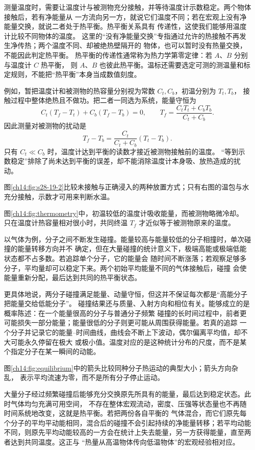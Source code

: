 测量温度时，需要让温度计与被测物充分接触，并等待温度计示数稳定。两个物体接触后，若有净能量从
一方流向另一方，就说它们温度不同；若在宏观上没有净能量交换，就说二者处于热平衡。热平衡关系具有
传递性，这使我们能够用温度计比较不同物体的温度。
这里的“没有净能量交换”专指通过允许的热接触不再发生净传热；两个温度不同、却被绝热壁隔开的
物体，也可以暂时没有热量交换，不能因此判定热平衡。
热平衡的传递性通常称为热力学第零定律：若 $A$、$B$ 分别与温度计 $C$ 热平衡，
则 $A$、$B$ 也彼此热平衡。温标还需要选定可测的测温量和标定规则，不能把“热平衡”本身当成数值刻度。

例如，暂把温度计和被测物的热容量分别视为常数 $C_t,C_b$，初温分别为 $T_t,T_b$，
接触过程中整体绝热且不做功。把二者一同选为系统，能量守恒为
\[
 C_t(T_f-T_t)+C_b(T_f-T_b)=0,
 \qquad T_f=\frac{C_tT_t+C_bT_b}{C_t+C_b}.
\]
因此测量对被测物的扰动是
\[
 T_f-T_b=\frac{C_t}{C_t+C_b}(T_t-T_b).
\]
只有 $C_t\ll C_b$ 时，温度计达到平衡的读数才接近被测物接触前的温度。
“等到示数稳定”排除了尚未达到平衡的误差，却不能消除温度计本身吸、放热造成的扰动。

图\ref{ch14:fig:s28-19-2}比较未接触与正确浸入的两种放置方式；只有右图的温包与水充分接触，示数才可用来判断水温。
\figureNineteenTwoFaithful

图\ref{ch14:fig:thermometry}中，初温较低的温度计吸收能量，而被测物略微冷却。
只在温度计热容量相对很小时，共同终温 $T_f$ 才近似等于被测物原来的温度。
\thermometerMeasurementDiagram

以气体为例，分子之间不断发生碰撞。能量较高与能量较低的分子相撞时，单次碰撞的能量转移方向并不
确定，但在大量碰撞的统计意义下，极端高能或极端低能状态都不占多数。若追踪单个分子，它的能量会
随时间不断涨落；若观察足够多分子，平均量却可以稳定下来。两个初始平均能量不同的气体接触后，碰撞
会使能量重新分配，最后达到共同的热平衡状态。

更具体地说，两分子碰撞满足能量、动量守恒，但这并不保证每次都是“高能分子把能量交给低能分子”。
碰撞结果还与质量、入射方向和相位有关。能够成立的是概率陈述：在一个能量很高的分子与普通分子频繁
碰撞的长时间过程中，前者更可能损失一部分能量；能量很低的分子则更可能从周围获得能量。若真的追踪
一个分子并记录它的能量--时间曲线，曲线会不断上下波动，偶尔偏离平均值，却不大可能永久停留在极大
或极小值。温度对应的是这种统计分布的尺度，而不是某个指定分子在某一瞬间的动能。

图\ref{ch14:fig:equilibrium}中的箭头比较同种分子热运动的典型大小；箭头方向杂乱，
表示平均流速为零，而不是所有分子停止运动。
\molecularEquilibriumDiagram

大量分子经过频繁碰撞后能够充分交换原先所具有的能量，最后达到稳定状态。此时气体均匀充满可用空间，
不存在整体宏观流动，密度、压强等状态量也不再随时间系统地改变，这就是热平衡。若把两份各自平衡的
气体混合，而它们原先每个分子的平均平动能相同，混合后的碰撞不会引起持续的净能量转移；若平均动能
不同，则原先平均动能较高的一方会在统计上失去能量，另一方获得能量，直至两者达到共同温度。这正与
“热量从高温物体传向低温物体”的宏观经验相对应。


